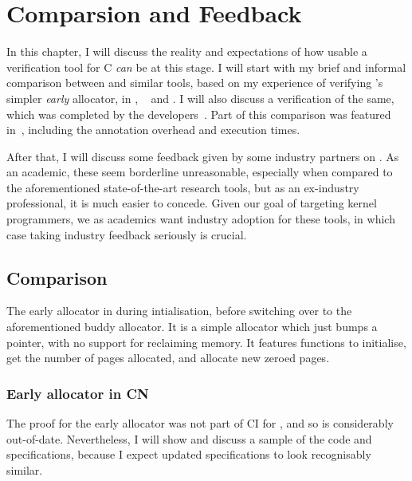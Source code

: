 \chapter{ Comparsion and Feedback}

\margintoc{}

In this chapter, I will discuss the reality and expectations of how usable a
verification tool for C \emph{can} be at this stage. I will start with my brief
and informal comparison between  and similar tools, based on my
experience of verifying 's simpler \emph{early} allocator, in ,
~ and
.
I will also discuss a  verification of the same, which was
completed by the developers~. Part of this
comparison was featured in~, including the annotation
overhead and execution times.

After that, I will discuss some feedback given by some industry partners on
. As an academic, these seem borderline unreasonable, especially when
compared to the aforementioned state-of-the-art research tools, but as an
ex-industry professional, it is much easier to concede. Given our goal of
targeting kernel programmers, we as academics want industry adoption for these
tools, in which case taking industry feedback seriously is crucial.

\section{Comparison}

The early allocator in  during intialisation, before switching over to
the aforementioned buddy allocator. It is a simple allocator which just bumps a
pointer, with no support for reclaiming memory. It features functions to
initialise, get the number of pages allocated, and allocate new zeroed pages.

\subsection{Early allocator in CN}

The proof for the early allocator was not part of CI for , and so is
considerably out-of-date. Nevertheless, I will show and discuss a sample
of the code and specifications, because I expect updated specifications
to look recognisably similar.

